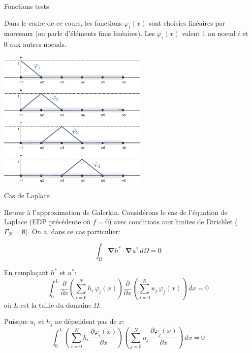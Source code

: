 \documentclass[
mode=present,    %
paper=a4paper,   %
orient=landscape,
display=slides,   %
size=10pt,     %
style=romain   %
]{powerdot}
\begin{document}
\begin{slide}{Fonctions tests}

Dans le cadre de ce cours, les fonctions $\varphi_i(x)$ sont choisies linéaires par morceaux (on parle d'éléments finis linéaires). Les $\varphi_i(x)$ valent 1 au noeud $i$ et 0 aux autres noeuds.

\bigskip

    \centerline{\includegraphics[width=0.55\textwidth]{phi1d.eps} }

\end{slide}

\begin{slide}{Cas de Laplace}

Retour à l'approximation de Galerkin. Considérons le cas de l'équation de Laplace (EDP précédente où $f=0$) avec conditions aux limites de Dirichlet ($\Gamma_N=\emptyset$). On a, dans ce cas particulier:

\begin{equation*}
    \int_{\Omega} \boldsymbol{\nabla} h^* \cdot \boldsymbol{\nabla} u^* \,d\Omega
     = 0
\end{equation*}

\bigskip

En remplaçant $h^*$ et $u^*$:
\begin{equation*}
    \int_0^L \frac{\partial}{\partial x} \left( \sum_{i=0}^N h_i\, \varphi_i(x) \right)
    \frac{\partial}{\partial x} \left( \sum_{j=0}^N u_j\, \varphi_j(x) \right) \, dx
     = 0
\end{equation*}
où $L$ est la taille du domaine $\Omega$.

\bigskip

Puisque $u_i$ et $h_j$ ne dépendent pas de $x$:
\begin{equation*}
    \int_0^L \left( \sum_{i=0}^N h_i\,\frac{\partial\varphi_i(x)}{\partial x} \right)
    \left( \sum_{j=0}^N u_j\, \frac{\partial\varphi_j(x)}{\partial x} \right) \, dx
     = 0
\end{equation*}


\end{slide}
\end{document}
